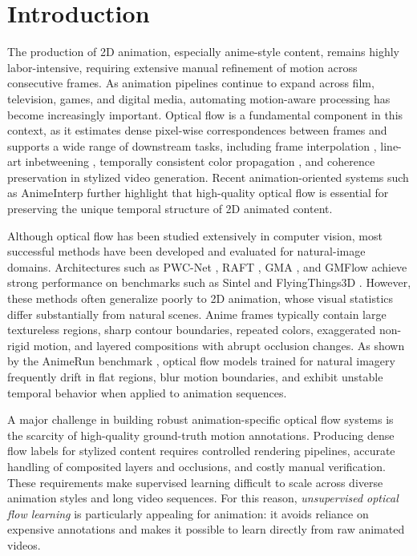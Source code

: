 \section{Introduction}

The production of 2D animation, especially anime-style content, remains highly labor-intensive, requiring extensive manual refinement of motion across consecutive frames. As animation pipelines continue to expand across film, television, games, and digital media, automating motion-aware processing has become increasingly important. Optical flow is a fundamental component in this context, as it estimates dense pixel-wise correspondences between frames and supports a wide range of downstream tasks, including frame interpolation \cite{animeinterp,superSloMo,softmaxSplat}, line-art inbetweening \cite{linedrawingFlow}, temporally consistent color propagation \cite{toonTracking}, and coherence preservation in stylized video generation. Recent animation-oriented systems such as AnimeInterp \cite{animeinterp} further highlight that high-quality optical flow is essential for preserving the unique temporal structure of 2D animated content.

Although optical flow has been studied extensively in computer vision, most successful methods have been developed and evaluated for natural-image domains. Architectures such as PWC-Net \cite{pwcnet}, RAFT \cite{raft}, GMA \cite{gma}, and GMFlow \cite{gmflow} achieve strong performance on benchmarks such as Sintel \cite{sintel} and FlyingThings3D \cite{ft3d}. However, these methods often generalize poorly to 2D animation, whose visual statistics differ substantially from natural scenes. Anime frames typically contain large textureless regions, sharp contour boundaries, repeated colors, exaggerated non-rigid motion, and layered compositions with abrupt occlusion changes. As shown by the AnimeRun benchmark \cite{animerun}, optical flow models trained for natural imagery frequently drift in flat regions, blur motion boundaries, and exhibit unstable temporal behavior when applied to animation sequences.

A major challenge in building robust animation-specific optical flow systems is the scarcity of high-quality ground-truth motion annotations. Producing dense flow labels for stylized content requires controlled rendering pipelines, accurate handling of composited layers and occlusions, and costly manual verification. These requirements make supervised learning difficult to scale across diverse animation styles and long video sequences. For this reason, \emph{unsupervised optical flow learning} is particularly appealing for animation: it avoids reliance on expensive annotations and makes it possible to learn directly from raw animated videos.

